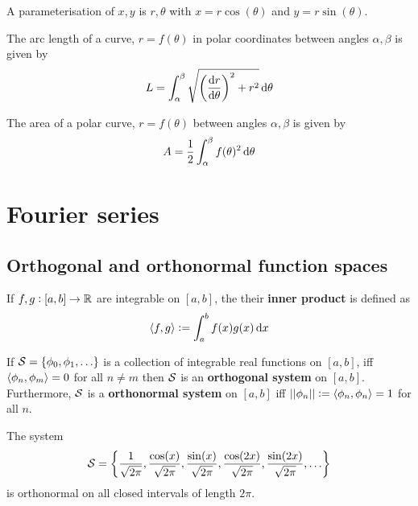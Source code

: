 \documentclass[../Year1.tex]{subfiles}
\begin{document}
\begin{definition}
    A parameterisation of $x,y$ is $r,\theta$ with $x=r\cos(\theta)$ and $y=r\sin(\theta)$.
\end{definition}

\begin{theorem}
    The arc length of a curve, $r=f(\theta)$ in polar coordinates between angles $\alpha,\beta$ is given by \[
        L = \intd{\alpha}{\beta}{\sqrt{\br{\frac{\dif r}{\dif \theta}}^2 + r^2}}{\theta}
    \]
\end{theorem}

\begin{theorem}
    The area of a polar curve, $r=f(\theta)$ between angles $\alpha,\beta$ is given by \[
        A = \frac{1}{2}\intd{\alpha}{\beta}{f(\theta)^2}{\theta}
    \]
\end{theorem}

\section{Fourier series}
\subsection{Orthogonal and orthonormal function spaces}

\begin{definition}
    If $f,g:[a,b]\rightarrow\mathbb{R}$ are integrable on $[a,b]$, the their \textbf{inner product} is defined as \[
        \abr{f,g} := \intd{a}{b}{f(x)g(x)}{x}
    \] 
\end{definition}

\begin{definition}
    If $\mathcal{S}=\{\phi_0,\phi_1,\ldots\}$ is a collection of integrable real functions on $[a,b]$, iff $\left\langle \phi_n,\phi_m \right\rangle=0$ for all $n\neq m$ then $\mathcal{S}$ is an \textbf{orthogonal system} on $[a,b]$. Furthermore, $\mathcal{S}$ is a \textbf{orthonormal system} on $[a,b]$ iff $||\phi_n||:=\left\langle \phi_n,\phi_n \right\rangle=1$ for all $n$.
\end{definition}

\begin{theorem}
    The system \[
        \mathcal{S} = \left\{ \frac{1}{\sqrt{2\pi}},\frac{\cos(x)}{\sqrt{2\pi}},\frac{\sin(x)}{\sqrt{2\pi}},\frac{\cos(2x)}{\sqrt{2\pi}},\frac{\sin(2x)}{\sqrt{2\pi}},\ldots\right\}
    \] is orthonormal on all closed intervals of length $2\pi$.
\end{theorem}
\end{document}
